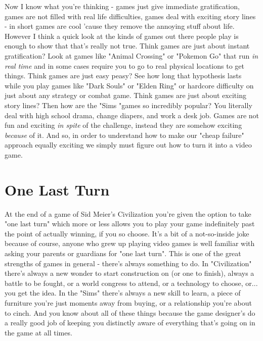 \documentclass[11pt,a5paper]{book}
\begin{document}
Now I know what you're thinking - games just give immediate gratification, games are not filled with real life difficulties, games deal with exciting story lines - in short games are cool 'cause they remove the annoying stuff about life. However I think a quick look at the kinds of games out there people play is enough to show that that's really not true. Think games are just about instant gratification? Look at games like "Animal Crossing" or "Pokemon Go" that run \textit{in real time} and in some cases require you to go to real physical locations to get things. Think games are just easy peasy? See how long that hypothesis lasts while you play games like "Dark Souls" or "Elden Ring" or hardcore difficulty on just about any strategy or combat game. Think games are just about exciting story lines? Then how are the "Sims "games so incredibly popular? You literally deal with high school drama, change diapers, and work a desk job. Games are not fun and exciting \textit{in spite} of the challenge, instead they are somehow exciting \textit{because} of it. And so, in order to understand how to make our "cheap failure" approach equally exciting we simply must figure out how to turn it into a video game. 

\section{One Last Turn}
At the end of a game of Sid Meier's Civilization you're given the option to take "one last turn" which more or less allows you to play your game indefinitely past the point of actually winning, if you so choose. It's a bit of a not-so-inside joke because of course, anyone who grew up playing video games is well familiar with asking your parents or guardians for "one last turn". This is one of the great strengths of games in general - there's always something to do. In "Civilization" there's always a new wonder to start construction on (or one to finish), always a battle to be fought, or a world congress to attend, or a technology to choose, or... you get the idea. In the "Sims" there's always a new skill to learn, a piece of furniture you're just moments away from buying, or a relationship you're about to cinch. And you know about all of these things because the game designer's do a really good job of keeping you distinctly aware of everything that's going on in the game at all times. 
\newline
\end{document}
